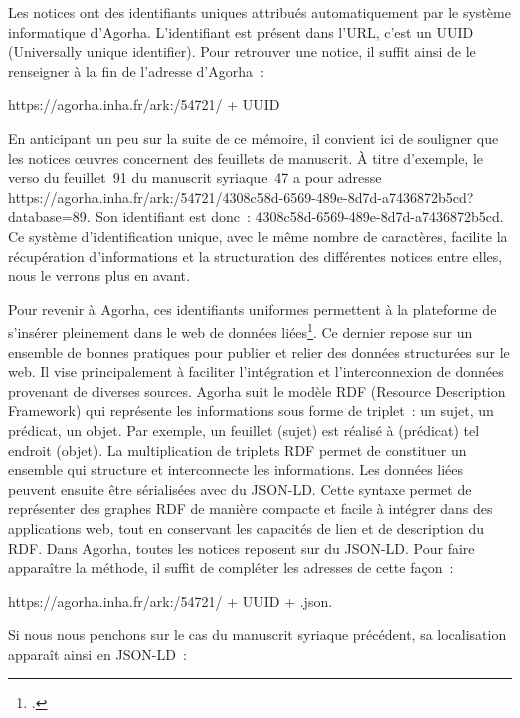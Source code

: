 Les notices ont des identifiants uniques attribués automatiquement par le système informatique d’Agorha. L’identifiant est présent dans l’URL, c’est un UUID (Universally unique identifier). Pour retrouver une notice, il suffit ainsi de le renseigner à la fin de l’adresse d’Agorha~: \par
https://agorha.inha.fr/ark:/54721/ + UUID \\\par
En anticipant un peu sur la suite de ce mémoire, il convient ici de souligner que les notices œuvres concernent des feuillets de manuscrit. À titre d’exemple, le verso du feuillet~91 du manuscrit syriaque~47 a pour adresse https://agorha.inha.fr/ark:/54721/4308c58d-6569-489e-8d7d-a7436872b5cd?database=89. Son identifiant est donc~: 4308c58d-6569-489e-8d7d-a7436872b5cd. Ce système d’identification unique, avec le même nombre de caractères, facilite la récupération d’informations et la structuration des différentes notices entre elles, nous le verrons plus en avant. \par
Pour revenir à Agorha, ces identifiants uniformes permettent à la plateforme de s’insérer pleinement dans le web de données liées\footcite{pochon_agorha_nodate}. Ce dernier repose sur un ensemble de bonnes pratiques pour publier et relier des données structurées sur le web. Il vise principalement à faciliter l'intégration et l'interconnexion de données provenant de diverses sources. Agorha suit le modèle RDF (Resource Description Framework) qui représente les informations sous forme de triplet : un sujet, un prédicat, un objet. Par exemple, un feuillet (sujet) est réalisé à (prédicat) tel endroit (objet). La multiplication de triplets RDF permet de constituer un ensemble qui structure et interconnecte les informations. Les données liées peuvent ensuite être sérialisées avec du JSON-LD. Cette syntaxe permet de représenter des graphes RDF de manière compacte et facile à intégrer dans des applications web, tout en conservant les capacités de lien et de description du RDF. Dans Agorha, toutes les notices reposent sur du JSON-LD. Pour faire apparaître la méthode, il suffit de compléter les adresses de cette façon~:\par https://agorha.inha.fr/ark:/54721/ + UUID + .json. \newline\par
Si nous nous penchons sur le cas du manuscrit syriaque précédent, sa localisation apparaît ainsi en JSON-LD~:

